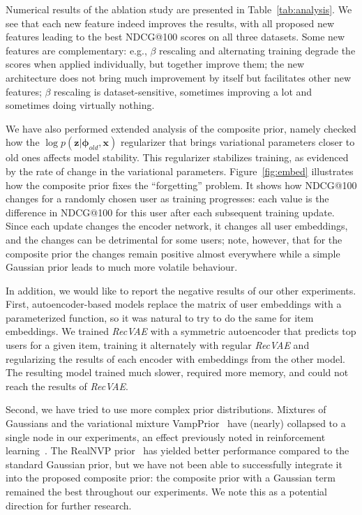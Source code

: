 \documentclass[sigconf,authorversion]{acmart}
\def\bz{{\bf z}}
\def\bphi{{\boldsymbol{\phi}}}
\def\bz{\boldsymbol{z}}
\def\bx{\boldsymbol{x}}
\begin{document}
Numerical results of the ablation study are presented in Table~\ref{tab:analysis}. We see that each new feature indeed improves the results, with all proposed new features leading to the best NDCG@100 scores on all three datasets. Some new features are complementary: e.g., $\beta$ rescaling and alternating training degrade the scores when applied individually, but together improve them; the new architecture does not bring much improvement by itself but facilitates other new features; $\beta$ rescaling is dataset-sensitive, sometimes improving a lot and sometimes doing virtually nothing.

We have also performed extended analysis of the composite prior, namely checked how the $\log p\left(\bz| \bphi_{old}, \bx\right)$ regularizer that brings variational parameters closer to old ones affects model stability. This regularizer stabilizes training, as evidenced by the rate of change in the variational parameters.
Figure~\ref{fig:embed} illustrates how the composite prior fixes the ``forgetting'' problem. It shows how NDCG@100 changes for a randomly chosen user as training progresses: each value is the difference in NDCG@100 for this user after each subsequent training update. Since each update changes the encoder network, it changes all user embeddings, and the changes can be detrimental for some users; note, however, that for the composite prior the changes remain positive almost everywhere while a simple Gaussian prior leads to much more volatile behaviour.

In addition, we would like to report the negative results of our other experiments. First, autoencoder-based models replace the matrix of user embeddings with a parameterized function, so it was natural to try to do the same for item embeddings. We trained \emph{RecVAE} with a symmetric autoencoder that predicts top users for a given item, training it alternately with regular \emph{RecVAE} and regularizing the results of each encoder with embeddings from the other model. The resulting model trained much slower, required more memory, and could not reach the results of \emph{RecVAE}.

Second, we have tried to use more complex prior distributions. Mixtures of Gaussians and the variational mixture VampPrior~\cite{tomczak2018vae} have (nearly) collapsed to a single node in our experiments, an effect previously noted in reinforcement learning~\cite{DBLP:journals/corr/abs-1809-10326}. The RealNVP prior~\cite{DBLP:conf/iclr/DinhSB17} has yielded better performance compared to the standard Gaussian prior, but we have not been able to successfully integrate it into the proposed composite prior: the composite prior with a Gaussian term remained the best throughout our experiments. We note this as a potential direction for further research.
\end{document}

